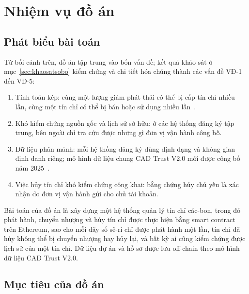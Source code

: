 \section{Nhiệm vụ đồ án}
\label{sec:nhiemvu}

\subsection*{Phát biểu bài toán}
\label{subsec:baitoan}

Từ bối cảnh trên, đồ án tập trung vào bốn vấn đề; kết quả khảo sát ở mục~\ref{sec:khaosatsobo} kiểm chứng và chi tiết hóa chúng thành các vấn đề VĐ-1 đến VĐ-5:
\begin{enumerate}
    \item Tính toán kép: cùng một lượng giảm phát thải có thể bị cấp tín chỉ nhiều lần, cùng một tín chỉ có thể bị bán hoặc sử dụng nhiều lần~\cite{schneider2019double}.
    \item Khó kiểm chứng nguồn gốc và lịch sử sở hữu: ở các hệ thống đăng ký tập trung, bên ngoài chỉ tra cứu được những gì đơn vị vận hành công bố.
    \item Dữ liệu phân mảnh: mỗi hệ thống đăng ký dùng định dạng và không gian định danh riêng; mô hình dữ liệu chung CAD Trust V2.0 mới được công bố năm 2025~\cite{cadtrust2025datamodel}.
    \item Việc hủy tín chỉ khó kiểm chứng công khai: bằng chứng hủy chủ yếu là xác nhận do đơn vị vận hành gửi cho chủ tài khoản.
\end{enumerate}

Bài toán của đồ án là xây dựng một hệ thống quản lý tín chỉ các-bon, trong đó phát hành, chuyển nhượng và hủy tín chỉ được thực hiện bằng smart contract trên Ethereum, sao cho mỗi dãy số sê-ri chỉ được phát hành một lần, tín chỉ đã hủy không thể bị chuyển nhượng hay hủy lại, và bất kỳ ai cũng kiểm chứng được lịch sử của một tín chỉ. Dữ liệu dự án và hồ sơ được lưu off-chain theo mô hình dữ liệu CAD Trust V2.0.

\subsection*{Mục tiêu của đồ án}
\label{subsec:muctieu}

